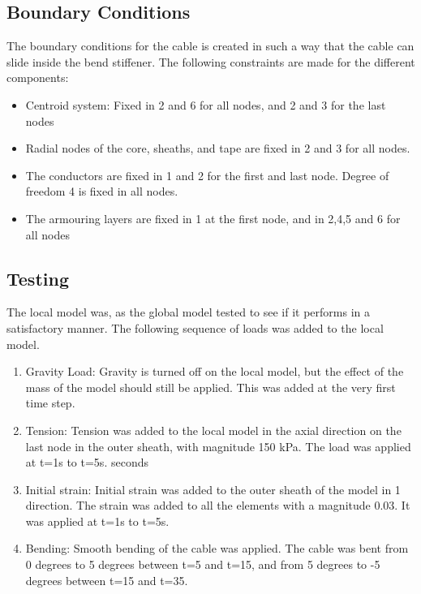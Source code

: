 \subsection{Boundary Conditions}
The boundary conditions for the cable is created in such a way that the cable can slide inside the bend stiffener. The following constraints are made for the different components:
\begin{itemize}
    \item Centroid system: Fixed in 2 and 6 for all nodes, and 2 and 3 for the last nodes
    \item Radial nodes of the core, sheaths, and tape are fixed in 2 and 3 for all nodes. 
    \item The conductors are fixed in 1 and 2 for the first and last node. Degree of freedom 4 is fixed in all nodes.
    \item The armouring layers are fixed in 1 at the first node, and in 2,4,5 and 6 for all nodes
\end{itemize}
\subsection {Testing}
\label{sec:localtest}
The local model was, as the global model tested to see if it performs in a satisfactory manner. The following sequence of loads was added to the local model. 
\begin{enumerate}
    \item Gravity Load: Gravity is turned off on the local model, but the effect of the mass of the model should still be applied. This was added at the very first time step.
    \item Tension: Tension was added to the local model in the axial direction on the last node in the outer sheath, with magnitude 150 kPa. The load was applied at t=1s to t=5s. seconds
    \item Initial strain: Initial strain was added to the outer sheath of the model in 1 direction. The strain was added to all the elements with a magnitude 0.03. It was applied at t=1s to t=5s.
    \item Bending: Smooth bending of the cable was applied. The cable was bent from 0 degrees to 5 degrees between t=5 and t=15, and from 5 degrees to -5 degrees between t=15 and t=35.  
\end{enumerate}


